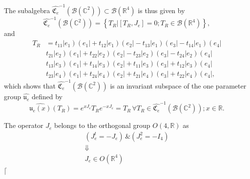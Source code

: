 \documentclass[aps,preprint]{revtex4}%
\begin{document}
The subalgebra $\widehat{\mathfrak{C}_{e}}^{-1}\left(  \mathcal{B}\left(
\mathbb{C}^{2}\right)  \right)  \subset\mathcal{B}\left(  \mathbb{R}%
^{4}\right)  $ is thus given by
\begin{equation}
\widehat{\mathfrak{C}_{e}}^{-1}\left(  \mathcal{B}\left(  \mathbb{C}%
^{2}\right)  \right)  =\left\{  \left.  T_{R}\right\vert \left[  T_{R}%
,J_{e}\right]  =0;T_{R}\in\mathcal{B}\left(  \mathbb{R}^{4}\right)  \right\}
,
\end{equation}
and
\begin{align}
T_{R}  &  =t_{11}\left\vert e_{1}\right)  \left(  e_{1}\right\vert
+t_{12}\left\vert e_{1}\right)  \left(  e_{2}\right\vert -t_{13}\left\vert
e_{1}\right)  \left(  e_{3}\right\vert -t_{14}\left\vert e_{1}\right)  \left(
e_{4}\right\vert \\
&  t_{21}\left\vert e_{2}\right)  \left(  e_{1}\right\vert +t_{22}\left\vert
e_{2}\right)  \left(  e_{2}\right\vert -t_{23}\left\vert e_{2}\right)  \left(
e_{3}\right\vert -t_{24}\left\vert e_{2}\right)  \left(  e_{4}\right\vert \\
&  t_{13}\left\vert e_{3}\right)  \left(  e_{1}\right\vert +t_{14}\left\vert
e_{3}\right)  \left(  e_{2}\right\vert +t_{11}\left\vert e_{3}\right)  \left(
e_{3}\right\vert +t_{12}\left\vert e_{3}\right)  \left(  e_{4}\right\vert \\
&  t_{23}\left\vert e_{4}\right)  \left(  e_{1}\right\vert +t_{24}\left\vert
e_{4}\right)  \left(  e_{2}\right\vert +t_{21}\left\vert e_{4}\right)  \left(
e_{3}\right\vert +t_{22}\left\vert e_{4}\right)  \left(  e_{4}\right\vert ,
\end{align}
which shows that $\widehat{\mathfrak{C}_{e}}^{-1}\left(  \mathcal{B}\left(
\mathbb{C}^{2}\right)  \right)  $ is an invariant subspace of the one
parameter group $\widehat{\mathfrak{u}_{e}}$ defined by
\begin{equation}
\widehat{\mathfrak{u}_{e}\left(  x\right)  }\left(  T_{R}\right)  =e^{xJ_{e}%
}T_{R}e^{-xJ_{e}}=T_{R}\,\forall T_{R}\in\widehat{\mathfrak{C}_{e}}%
^{-1}\left(  \mathcal{B}\left(  \mathbb{C}^{2}\right)  \right)  ;x\in
\mathbb{R}.
\end{equation}


The operator $J_{e}$ belongs to the orthogonal group $O\left(  4,\mathbb{R}%
\right)  $ as
\begin{gather}
\left(  J_{e}^{t}=-J_{e}\right)  \,\&\left(  J_{e}^{2}=-I_{4}\right) \\
\Downarrow\\
J_{e}\in O\left(  \mathbb{R}^{4}\right)
\end{gather}
$\lceil$%
\end{document}
